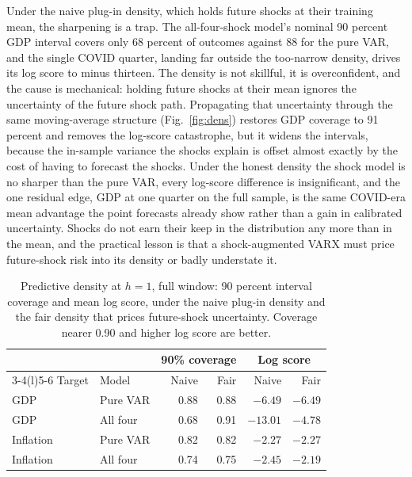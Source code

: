 \documentclass[conference]{IEEEtran}
\begin{document}
Under the naive plug-in density, which holds future shocks at their training mean, the sharpening is a trap. The all-four-shock model's nominal 90 percent GDP interval covers only 68 percent of outcomes against 88 for the pure VAR, and the single COVID quarter, landing far outside the too-narrow density, drives its log score to minus thirteen. The density is not skillful, it is overconfident, and the cause is mechanical: holding future shocks at their mean ignores the uncertainty of the future shock path. Propagating that uncertainty through the same moving-average structure (Fig.~\ref{fig:dens}) restores GDP coverage to 91 percent and removes the log-score catastrophe, but it widens the intervals, because the in-sample variance the shocks explain is offset almost exactly by the cost of having to forecast the shocks. Under the honest density the shock model is no sharper than the pure VAR, every log-score difference is insignificant, and the one residual edge, GDP at one quarter on the full sample, is the same COVID-era mean advantage the point forecasts already show rather than a gain in calibrated uncertainty. Shocks do not earn their keep in the distribution any more than in the mean, and the practical lesson is that a shock-augmented VARX must price future-shock risk into its density or badly understate it.

\begin{table}[t]
\caption{Predictive density at $h=1$, full window: 90 percent interval coverage and mean log score, under the naive plug-in density and the fair density that prices future-shock uncertainty. Coverage nearer 0.90 and higher log score are better.}
\label{tab:dens}
\centering
\small
\setlength{\tabcolsep}{4pt}
\begin{tabular}{@{}llrrrr@{}}
\toprule
& & \multicolumn{2}{c}{90\% coverage} & \multicolumn{2}{c}{Log score} \\
\cmidrule(l){3-4}\cmidrule(l){5-6}
Target & Model & Naive & Fair & Naive & Fair \\
\midrule
GDP & Pure VAR & 0.88 & 0.88 & $-6.49$ & $-6.49$ \\
GDP & All four & 0.68 & 0.91 & $-13.01$ & $-4.78$ \\
Inflation & Pure VAR & 0.82 & 0.82 & $-2.27$ & $-2.27$ \\
Inflation & All four & 0.74 & 0.75 & $-2.45$ & $-2.19$ \\
\bottomrule
\end{tabular}
\end{table}
\end{document}
